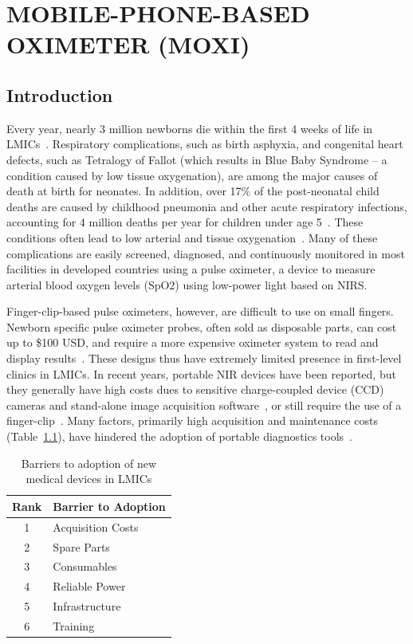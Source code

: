 
\chapter{MOBILE-PHONE-BASED OXIMETER (MOXI)} %
\label{chap:moxi}


\section{Introduction} %
\label{chap:moxi:introduction}
Every year, nearly 3 million newborns die within the first 4 weeks of life in \ac{LMIC}s~\cite{Worldhealthorganization2006}. Respiratory complications, such as birth asphyxia, and congenital heart defects, such as Tetralogy of Fallot (which results in Blue Baby Syndrome – a condition caused by low tissue oxygenation), are among the major causes of death at birth for neonates. In addition, over 17\% of the post-neonatal child deaths are caused by childhood pneumonia and other acute respiratory infections, accounting for 4 million deaths per year for children under age 5~\cite{Alexander2018}. These conditions often lead to low arterial and tissue oxygenation~\cite{Weber2003}. Many of these complications are easily screened, diagnosed, and continuously monitored in most facilities in developed countries using a pulse oximeter, a device to measure arterial blood oxygen levels (SpO2) using low-power light based on NIRS. 

Finger-clip-based pulse oximeters, however, are difficult to use on small fingers. Newborn specific pulse oximeter probes, often sold as disposable parts, can cost up to \$100 USD, and require a more expensive oximeter system to read and display results~\cite{Ouro-BangnaMaman2005,Heywood1989}. These designs thus have extremely limited presence in first-level clinics in LMICs. In recent years, portable NIR devices have been reported, but they generally have high costs dues to sensitive charge-coupled device (CCD) cameras and stand-alone image acquisition software~\cite{Jung2013}, or still require the use of a finger-clip~\cite{Karlen2011,Hudson2012}. Many factors, primarily high acquisition and maintenance costs (Table~\ref{tab:lmicbarriers}), have hindered the adoption of portable diagnostics tools~\cite{Malkin2007}. 

\begin{table}[]
\centering
\caption{Barriers to adoption of new medical devices in LMICs}
\label{tab:lmicbarriers}
\begin{tabular}{@{}cl@{}}
\toprule
Rank & Barrier to Adoption \\ \midrule
1    & Acquisition Costs   \\
2    & Spare Parts         \\
3    & Consumables         \\
4    & Reliable Power      \\
5    & Infrastructure      \\
6    & Training            \\ \bottomrule
\end{tabular}
\end{table}

